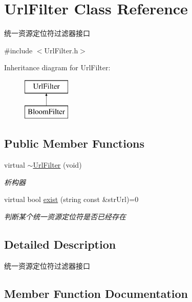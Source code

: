 \hypertarget{class_url_filter}{}\section{Url\+Filter Class Reference}
\label{class_url_filter}


统一资源定位符过滤器接口  




{\ttfamily \#include $<$Url\+Filter.\+h$>$}

Inheritance diagram for Url\+Filter\+:\begin{figure}[H]
\begin{center}
\leavevmode
\includegraphics[height=2.000000cm]{class_url_filter}
\end{center}
\end{figure}
\subsection*{Public Member Functions}
\begin{DoxyCompactItemize}
\item 
\mbox{\label{class_url_filter_ab6e4a890e83468c2717a89779c5dcc61}} 
virtual \hyperlink{class_url_filter_ab6e4a890e83468c2717a89779c5dcc61}{$\sim$\+Url\+Filter} (void)
\begin{DoxyCompactList}\small\item\em 析构器 \end{DoxyCompactList}\item 
virtual bool \hyperlink{class_url_filter_a581b9ea03daefbf52344ceb3371f409a}{exist} (string const \&str\+Url)=0
\begin{DoxyCompactList}\small\item\em 判断某个统一资源定位符是否已经存在 \end{DoxyCompactList}\end{DoxyCompactItemize}


\subsection{Detailed Description}
统一资源定位符过滤器接口 

\subsection{Member Function Documentation}
\mbox{\label{class_url_filter_a581b9ea03daefbf52344ceb3371f409a}} 
